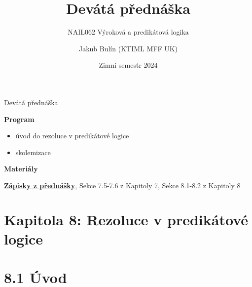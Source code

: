 \documentclass{beamer}
\title{Devátá přednáška}
\subtitle{NAIL062 Výroková a predikátová logika}
\author{Jakub Bulín (KTIML MFF UK)}
\date{Zimní semestr 2024}
\begin{document}
\maketitle


\begin{frame}{Devátá přednáška}

    \textbf{Program}
        \begin{itemize}
            \item úvod do rezoluce v predikátové logice
            \item skolemizace
        \end{itemize}

    \textbf{Materiály}

        \href{https://github.com/jbulin-mff-uk/nail062/raw/main/lecture/lecture-notes/lecture-notes.pdf}{\alert{\textbf{Zápisky z přednášky}}}, Sekce 7.5-7.6 z Kapitoly 7, Sekce 8.1-8.2 z Kapitoly 8

\end{frame}


\section{\sc Kapitola 8: Rezoluce v predikátové logice}


\section{8.1 Úvod}
\end{document}
